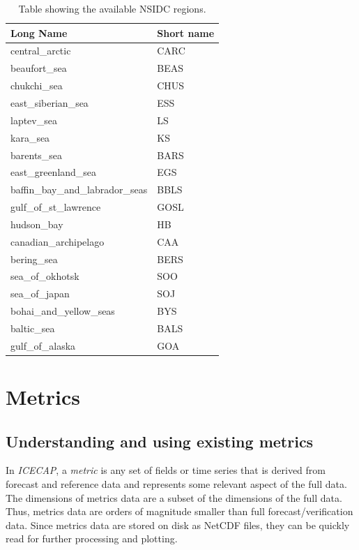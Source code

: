 \documentclass[DIV=10, parskip=full]{scrreprt}
\newcommand{\ice}{\textit{ICECAP}\xspace}
\begin{document}
\begin{table}[!h]
	\centering
	\begin{tabular}{@{}ll@{}}
		\toprule
		\textbf{Long Name}               & \textbf{Short name} \\ \midrule
		central\_arctic                  & CARC                \\
		beaufort\_sea                    & BEAS                \\
		chukchi\_sea                     & CHUS                \\
		east\_siberian\_sea              & ESS                 \\
		laptev\_sea                      & LS                  \\
		kara\_sea                        & KS                  \\
		barents\_sea                     & BARS                \\
		east\_greenland\_sea             & EGS                 \\
		baffin\_bay\_and\_labrador\_seas & BBLS                \\
		gulf\_of\_st\_lawrence           & GOSL                \\
		hudson\_bay                      & HB                  \\
		canadian\_archipelago            & CAA                 \\
		bering\_sea                      & BERS                \\
		sea\_of\_okhotsk                 & SOO                 \\
		sea\_of\_japan                   & SOJ                 \\
		bohai\_and\_yellow\_seas         & BYS                 \\
		baltic\_sea                      & BALS                \\
		gulf\_of\_alaska                 & GOA                 \\ \bottomrule
	\end{tabular}
	\caption{Table showing the available NSIDC regions. }
	\label{tab:NSIDC}
\end{table}

\clearpage

\section{Metrics}\label{chap:metrics}
\subsection{Understanding and using existing metrics}
In \ice, a \emph{metric} is any set of fields or time series that is derived from forecast and reference data and represents some relevant aspect of the full data. The dimensions of metrics data are a subset of the dimensions of the full data. Thus, metrics data are orders of magnitude smaller than full forecast/verification data. Since metrics data are stored on disk as NetCDF files, they can be quickly read for further processing and plotting. 
\end{document}
